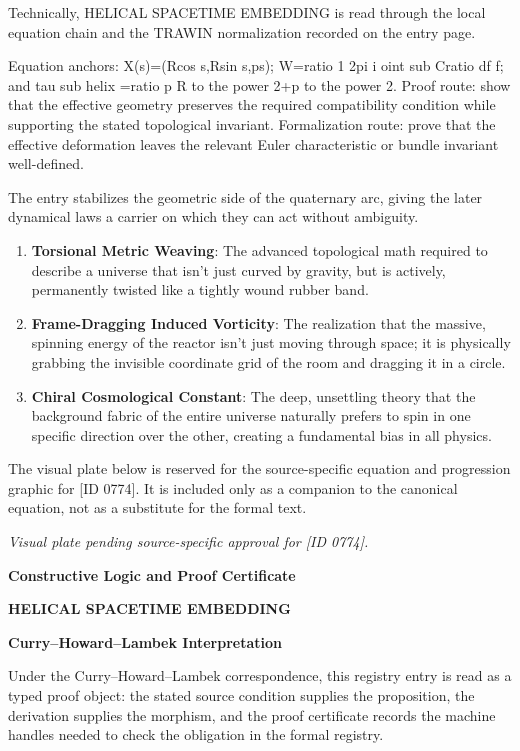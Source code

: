 Technically, HELICAL SPACETIME EMBEDDING is read through the local equation chain and the TRAWIN normalization recorded on the entry page.

Equation anchors: X(s)=(Rcos s,Rsin s,ps); W=ratio 1 2pi i oint sub Cratio df f; and tau sub helix =ratio p R to the power 2+p to the power 2. Proof route: show that the effective geometry preserves the required compatibility condition while supporting the stated topological invariant. Formalization route: prove that the effective deformation leaves the relevant Euler characteristic or bundle invariant well-defined.

The entry stabilizes the geometric side of the quaternary arc, giving the later dynamical laws a carrier on which they can act without ambiguity.
\endgroup

\begin{enumerate}[leftmargin=1.6em,itemsep=6pt,topsep=4pt]
\item \textbf{Torsional Metric Weaving}: The advanced topological math required to describe a universe that isn't just curved by gravity, but is actively, permanently twisted like a tightly wound rubber band.
\item \textbf{Frame-Dragging Induced Vorticity}: The realization that the massive, spinning energy of the reactor isn't just moving through space; it is physically grabbing the invisible coordinate grid of the room and dragging it in a circle.
\item \textbf{Chiral Cosmological Constant}: The deep, unsettling theory that the background fabric of the entire universe naturally prefers to spin in one specific direction over the other, creating a fundamental bias in all physics.
\end{enumerate}

\begingroup\footnotesize\sloppy
The visual plate below is reserved for the source-specific equation and progression graphic for [ID 0774]. It is included only as a companion to the canonical equation, not as a substitute for the formal text.
\par\endgroup
\begingroup\footnotesize\itshape
Visual plate pending source-specific approval for [ID 0774].
\par\endgroup

\clearpage
\begingroup\tzpsupportsetup
\noindent\textbf{\fontsize{10.8pt}{12.8pt}\selectfont [ID 0774] Constructive Logic and Proof Certificate}\par
\noindent\textbf{\fontsize{10pt}{12pt}\selectfont HELICAL SPACETIME EMBEDDING}\par
\vspace{0.45em}
\begingroup
\footnotesize
\setlength{\parskip}{0.22em}
\setlength{\parindent}{0pt}
\noindent\textbf{Curry--Howard--Lambek Interpretation}\par
Under the Curry--Howard--Lambek correspondence, this registry entry is read as a typed proof
object: the stated source condition supplies the proposition, the derivation supplies the
morphism, and the proof certificate records the machine handles needed to check the obligation
in the formal registry.

